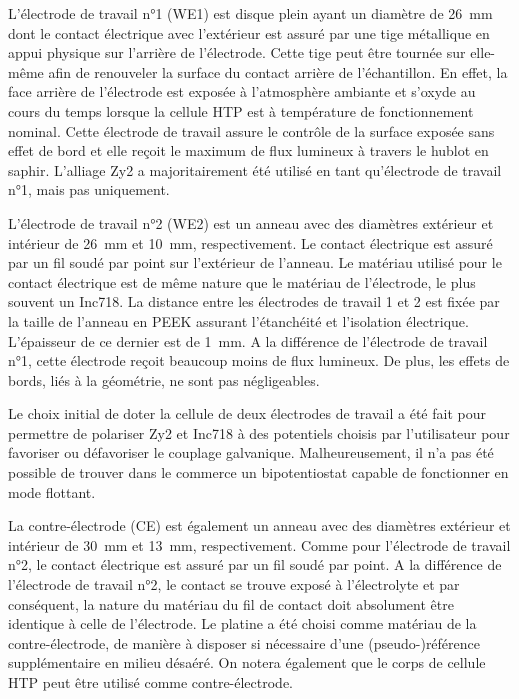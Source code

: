 \begin{refsection}
        L’électrode de travail n°1 (WE1) est disque plein ayant un diamètre de \SI{26}{\milli\meter} 
        dont le contact électrique avec l'extérieur est assuré par une tige métallique en appui physique sur l’arrière 
        de l’électrode. Cette tige peut être tournée sur elle-même afin de renouveler la surface du contact arrière de
        l'échantillon. 
        En effet, la face arrière de l’électrode est exposée à l’atmosphère ambiante et s’oxyde au cours du 
        temps lorsque la cellule HTP est à température de fonctionnement nominal. 
        Cette électrode de travail assure le contrôle de la surface exposée sans effet de bord et elle reçoit le maximum
        de flux lumineux à travers le hublot en saphir. 
        L'alliage Zy2 a majoritairement été utilisé en tant qu'électrode de travail n°1, mais pas uniquement.

        L’électrode de travail n°2 (WE2) est un anneau avec des diamètres extérieur et intérieur 
        de \SI{26}{\milli\meter} et \SI{10}{\milli\meter}, respectivement. 
        Le contact électrique est assuré par un fil soudé par point sur l’extérieur de l’anneau. 
        Le matériau utilisé pour le contact électrique est de même nature que le matériau de l’électrode, le plus
        souvent un Inc718.
        La distance entre les électrodes de travail 1 et 2 est fixée par la taille de l'anneau en PEEK assurant l'étanchéité
        et l'isolation électrique. L'épaisseur de ce dernier est de \SI{1}{\milli\meter}.
        A la différence de l'électrode de travail n°1, cette électrode reçoit
        beaucoup moins de flux lumineux. De plus, les effets de bords, liés à la géométrie, ne sont pas négligeables.

        Le choix initial de doter la cellule de deux électrodes de travail a été fait pour permettre de polariser Zy2 et
        Inc718 à des potentiels choisis par l'utilisateur pour favoriser ou défavoriser le couplage galvanique.
        Malheureusement, il n'a pas été possible de trouver dans le commerce un bipotentiostat capable de fonctionner en
        mode flottant.

        La contre-électrode (CE) est également un anneau avec des diamètres extérieur et intérieur 
        de \SI{30}{\milli\meter} et \SI{13}{\milli\meter}, respectivement. 
        Comme pour l’électrode de travail n°2, le contact électrique est assuré par un fil soudé par point.
        A la différence de l’électrode de travail n°2, le contact se trouve exposé à l’électrolyte et par conséquent,
        la nature du matériau du fil de contact doit absolument être identique à celle de l’électrode. 
        Le platine a été choisi comme matériau de la contre-électrode, de manière à disposer si nécessaire d'une
        (pseudo-)référence supplémentaire en milieu désaéré.
        On notera également que le corps de cellule HTP peut être utilisé comme contre-électrode.
        

\end{refsection}
